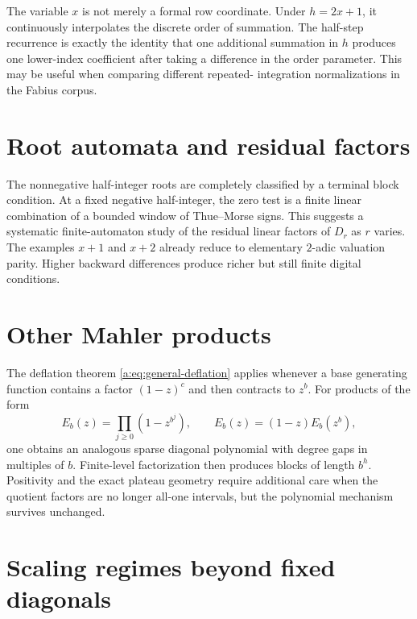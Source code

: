 \documentclass[11pt,a4paper,oneside,openany]{book}
\numberwithin{equation}{chapter}
\theoremstyle{definition}
\theoremstyle{remark}
\newcommand{\Diag}{D}
\begin{document}
The variable \(x\) is not merely a formal row coordinate.  Under
\(h=2x+1\), it continuously interpolates the discrete order of summation.  The
half-step recurrence is exactly the identity that one additional summation in
\(h\) produces one lower-index coefficient after taking a difference in the
order parameter.  This may be useful when comparing different repeated-
integration normalizations in the Fabius corpus.

\section{Root automata and residual factors}

The nonnegative half-integer roots are completely classified by a terminal
block condition.  At a fixed negative half-integer, the zero test is a finite
linear combination of a bounded window of Thue--Morse signs.  This suggests a
systematic finite-automaton study of the residual linear factors of
\(\Diag_r\) as \(r\) varies.  The examples \(x+1\) and \(x+2\) already reduce
to elementary \(2\)-adic valuation parity.  Higher backward differences
produce richer but still finite digital conditions.

\section{Other Mahler products}

The deflation theorem \eqref{a:eq:general-deflation} applies whenever a base
generating function contains a factor \((1-z)^c\) and then contracts to
\(z^b\).  For products of the form
\[
 E_b(z)=\prod_{j\ge0}(1-z^{b^j}),
 \qquad
 E_b(z)=(1-z)E_b(z^b),
\]
one obtains an analogous sparse diagonal polynomial with degree gaps in
multiples of \(b\).  Finite-level factorization then produces blocks of length
\(b^h\).  Positivity and the exact plateau geometry require additional care
when the quotient factors are no longer all-one intervals, but the polynomial
mechanism survives unchanged.
\section{Scaling regimes beyond fixed diagonals}
\end{document}
